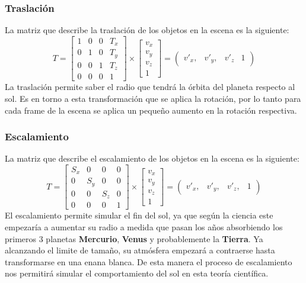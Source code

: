 \documentclass[12pt,journal,compsoc]{IEEEtran}
\begin{document}
\subsubsection{Traslación}
La matriz que describe la traslación de los objetos en la escena es la siguiente:\\

\[ 
	T = \left[ 
			\begin{array}{cccc}
				1 & 0 & 0 & T_{x} \\
				0 & 1 & 0 & T_{y} \\
				0 & 0 & 1 & T_{z} \\
				0 & 0 & 0 & 1 
			\end{array}
		\right] \times 
		\left[ 
			\begin{array}{c}
				v_{x} \\
				v_{y} \\
				v_{z} \\
				1 
			\end{array}
		\right] = 
		\left(
			\begin{array}{cccc}
				v'_{x} , & v'_{y} , & v'_{z} & 1
			\end{array}
		\right)
\]
La traslación permite saber el radio que tendrá la órbita del planeta respecto al sol. Es en torno a esta transformación que se aplica la rotación, por lo tanto para cada frame de la escena se aplica un pequeño aumento en la rotación respectiva.\\
\subsubsection{Escalamiento}
\label{escalamiento}
La matriz que describe el escalamiento de los objetos en la escena es la siguiente:\\
\[ 
	T = \left[ 
			\begin{array}{cccc}
				S_{x} & 0 & 0 & 0 \\
				0 & S_{y} & 0 & 0 \\
				0 & 0 & S_{z} & 0 \\
				0 & 0 & 0 & 1 
			\end{array}
		\right] \times 
		\left[ 
			\begin{array}{c}
				v_{x} \\
				v_{y} \\
				v_{z} \\
				1 
			\end{array}
		\right] = 
		\left(
			\begin{array}{cccc}
				v'_{x} , & v'_{y} , & v'_{z}, & 1
			\end{array}
		\right)
\]
El escalamiento permite simular el fin del sol, ya que según la ciencia\cite{Baker2015} este empezaría a aumentar su radio a medida que pasan los años absorbiendo los primeros 3 planetas \textbf{Mercurio}, \textbf{Venus} y probablemente la \textbf{Tierra}. Ya alcanzando el limite de tamaño, su atmósfera empezará a contraerse hasta transformarse en una enana blanca. De esta manera el proceso de escalamiento nos permitirá simular el comportamiento del sol en esta teoría científica.
\end{document}
